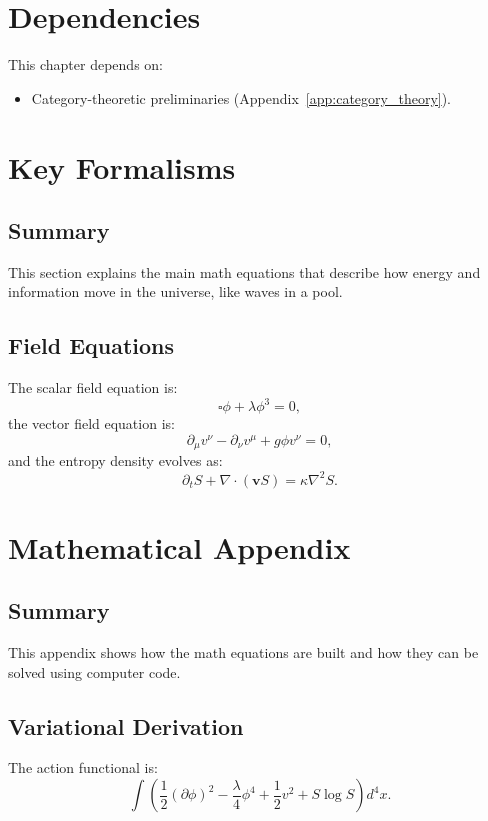 \documentclass[11pt,oneside]{memoir}
\theoremstyle{plain}
\begin{document}
\section{Dependencies}
This chapter depends on:
\begin{itemize}
    \item Category-theoretic preliminaries (Appendix~\ref{app:category_theory}).
\end{itemize}

\section{Key Formalisms}
\subsection{Summary}
This section explains the main math equations that describe how energy and information move in the universe, like waves in a pool.

\subsection{Field Equations}
The scalar field equation is:
\begin{equation}
    \square \phi + \lambda \phi^3 = 0,
\end{equation}
the vector field equation is:
\begin{equation}
    \partial_\mu v^\nu - \partial_\nu v^\mu + g \phi v^\nu = 0,
\end{equation}
and the entropy density evolves as:
\begin{equation}
    \partial_t S + \nabla \cdot (\mathbf{v} S) = \kappa \nabla^2 S.
\end{equation}

\section{Mathematical Appendix}
\subsection{Summary}
This appendix shows how the math equations are built and how they can be solved using computer code.

\subsection{Variational Derivation}
The action functional is:
\begin{equation}
    \int \left( \frac{1}{2} (\partial \phi)^2 - \frac{\lambda}{4} \phi^4 + \frac{1}{2} v^2 + S \log S \right) d^4 x.
\end{equation}
\end{document}

